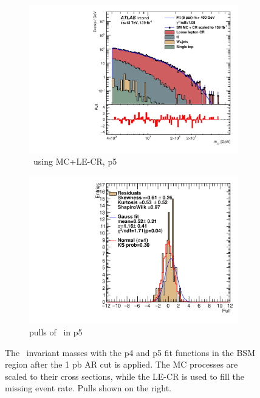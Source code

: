 \begin{figure}[ht]
\begin{subfigure}[h]{0.38\linewidth}
    \includegraphics[scale=0.3]{figs/ch6/fit/variable_nosmooth/p5/1PB/output_SMMCplusCR_Mjg_p5.pdf}%
     \caption{\mjph \ using MC+LE-CR, p5}
     \end{subfigure}
     \hfill
    \begin{subfigure}[h]{0.4\linewidth}
    \includegraphics[scale=0.32]{figs/ch6/fit/variable_nosmooth/p5/1PB/pull_SMMCplusCR_Mjg_p5.pdf}%
    \caption{pulls of \mjph \ in p5}
    \end{subfigure}
    \caption{The \mjph \ invariant masses with the p4 and p5 fit functions in the BSM region after the 1 pb AR cut is applied. The MC processes are scaled to their cross sections, while the LE-CR is used to fill the missing event rate. Pulls shown on the right.}
\label{fig:mjg-fit-pulls-1pb}
\end{figure}

